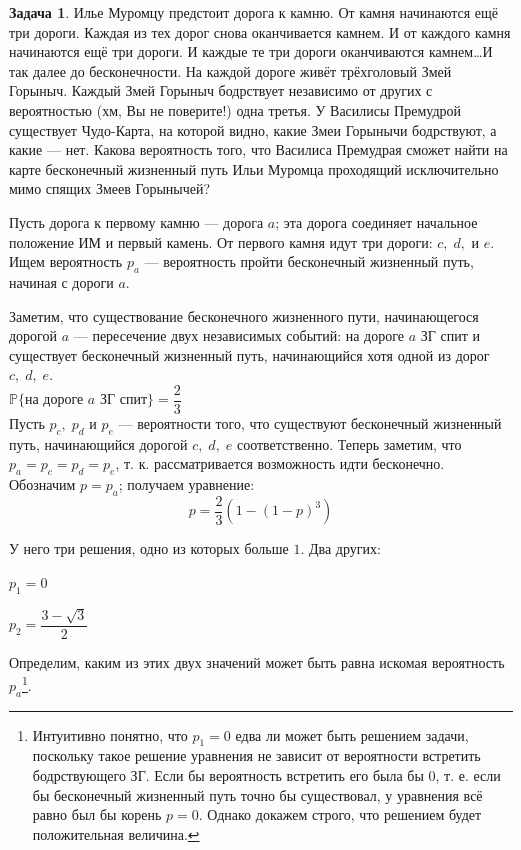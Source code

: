 \documentclass[nobib]{tufte-handout}
\theoremstyle{definition}
\newtheorem{problem}{Задача}
\begin{document}
\begin{problem}
Илье Муромцу предстоит дорога к камню. От камня начинаются ещё три дороги. Каждая из тех дорог снова оканчивается камнем. И от каждого камня начинаются ещё три дороги. И каждые те три дороги оканчиваются камнем\ldots И так далее до бесконечности. На каждой дороге живёт трёхголовый Змей Горыныч. Каждый Змей Горыныч бодрствует независимо от других с вероятностью (хм, Вы не поверите!) одна третья. У Василисы Премудрой существует Чудо-Карта, на которой видно, какие Змеи Горынычи бодрствуют, а какие — нет. Какова вероятность того, что Василиса Премудрая сможет найти на карте  бесконечный жизненный путь Ильи Муромца проходящий исключительно мимо спящих Змеев Горынычей?


\begin{sol}
Пусть дорога к первому камню — дорога $a$; эта дорога соединяет начальное положение ИМ и первый камень. От первого камня идут три дороги: $c, \; d,\text{ и }e$. Ищем вероятность $p_a$ — вероятность пройти бесконечный жизненный путь, начиная с дороги $a$.

Заметим, что существование бесконечного жизненного пути, начинающегося дорогой $a$ — пересечение двух независимых событий: на дороге $a$ ЗГ спит и существует бесконечный жизненный путь, начинающийся хотя одной из дорог $c, \; d, \; e$.
~\\

$\mathbb{P} \text{\{на дороге } a \text{ ЗГ спит\}} = \dfrac{2}{3}$
~\\

Пусть $p_c,\; p_d$ и $p_e$ — вероятности того, что существуют бесконечный жизненный путь, начинающийся дорогой $c, \; d, \; e$ соответственно. Теперь заметим, что $p_a=p_c= p_d=p_e$, т. к. рассматривается возможность идти бесконечно. Обозначим $p = p_a$; получаем уравнение:
\[
p = \dfrac{2}{3}\left(1 - (1-p)^3\right)
\]

У него три решения, одно из которых больше $1$. Два других:
\begin{center}
\begin{minipage}{52mm}
$p_1=0$
\end{minipage}
\hspace{0mm}
\begin{minipage}{22mm}
$p_2=\dfrac{3 - \sqrt{3}}{2}$
\end{minipage}
\end{center}

Определим, каким из этих двух значений может быть равна искомая вероятность $p_a$\footnote{Интуитивно понятно, что $p_1=0$ едва ли может быть решением задачи, поскольку такое решение уравнения не зависит от вероятности встретить бодрствующего ЗГ. Если бы вероятность встретить его была бы $0$, т. е. если бы бесконечный жизненный путь точно бы существовал, у уравнения всё равно был бы корень $p=0$. Однако докажем строго, что решением будет положительная величина.}.


\end{sol}
\end{problem}
\end{document}
